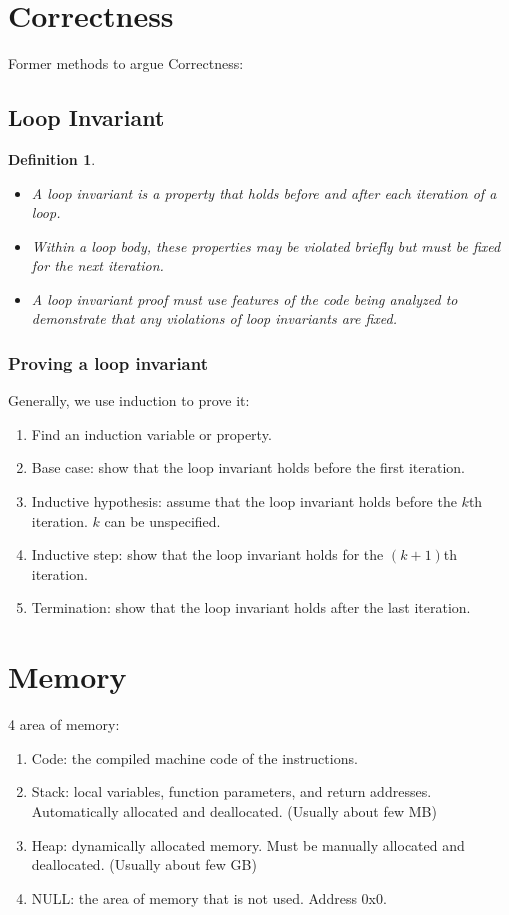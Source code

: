 \documentclass[letterpaper,12pt]{article}
\newtheorem{definition}{Definition}
\begin{document}
\section{Correctness}
Former methods to argue Correctness:
\subsection{Loop Invariant}
\begin{definition}
    \begin{itemize}
        \item A loop invariant is a property that holds before and after each iteration of a loop.
        \item Within a loop body, these properties may be violated briefly but must be fixed for the next iteration.
        \item A loop invariant proof must use features of the code being analyzed to demonstrate that any violations of loop invariants are fixed.
    \end{itemize}
\end{definition}
\subsubsection{Proving a loop invariant}
Generally, we use induction to prove it:\begin{enumerate}
    \item Find an induction variable or property.
    \item Base case: show that the loop invariant holds before the first iteration.
    \item Inductive hypothesis: assume that the loop invariant holds before the $k$th iteration. $k$ can be unspecified.
    \item Inductive step: show that the loop invariant holds for the $(k+1)$th iteration.
    \item Termination: show that the loop invariant holds after the last iteration.
\end{enumerate}

\section{Memory}
4 area of memory: \begin{enumerate}
    \item Code: the compiled machine code of the instructions.
    \item Stack: local variables, function parameters, and return addresses. Automatically allocated and deallocated. (Usually about few MB)
    \item Heap: dynamically allocated memory. Must be manually allocated and deallocated. (Usually about few GB)
    \item NULL: the area of memory that is not used. Address 0x0.
\end{enumerate}
\end{document}
